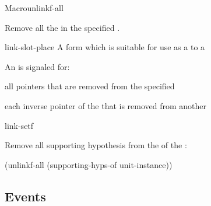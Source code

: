 \documentclass[10pt,twoside,english,pdftex]{article}
\begin{document}
\begin{functiondoc}{Macro}{unlinkf-all}{}
%
%

\fnsyntax

\fnpurpose Remove all the  in the specified
.

\fnpackage {}

\fnmodule {}

\fnargs
\begin{args}{link-slot-place}
 A form which is suitable for use as a
 to a 
\end{args}

\fnevents
{}%
%
%
%
%
%
An  is signaled for:
\begin{tightitemize}
\item all pointers that are removed from the specified
\item each inverse pointer of the  that is removed from
  another 
\end{tightitemize}

\begin{alsos}{link-setf}
\also[linkf]
\also[unlinkf]
\end{alsos}

\fnexample
Remove all supporting hypothesis  from the
  of the 
 :  
%
\W\supp
\begin{example}
  (unlinkf-all (supporting-hyps-of unit-instance))
\end{example}

\end{functiondoc}


\W\renewcommand{\subsubentities}{1}

\T\markright{}%
\T\pagestyle{plain}
\T\clearpage
\W{}
\T\pagestyle{fancy}
\T\thispagestyle{fancybottom}
\T\global\def\fnlastname{ }%

\subsection{Events}
\label{sec:events}%
\end{document}
